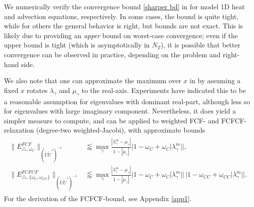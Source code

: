 \documentclass[VANCOUVER,STIX1COL]{WileyNJD-v2}
\begin{document}
We numerically verify the convergence bound \eqref{sharper bd} in 
for model 1D heat and advection equations, respectively. In some cases, the bound is quite tight,
while for others the general behavior is right, but bounds are not exact. This is likely due to
 providing an \emph{upper} bound on worst-case convergence; even if the upper
bound is tight (which  is asymptotically in $N_T$), it is possible that better
convergence can be observed in practice, depending on the problem and right-hand side.


\begin{remark}
We also note that one can approximate the maximum over $x$ in  by assuming
a fixed $x$ rotates $\lambda_\gamma$ and $\mu_\gamma$ to the real-axis. Experiments have indicated this to be a reasonable assumption for eigenvalues with dominant real-part, although less so for eigenvalues with large imaginary component. Nevertheless, it does yield a simpler measure to compute, and can be applied to weighted FCF- and FCFCF-relaxation (degree-two weighted-Jacobi), with approximate bounds
\begin{align} \label{bd FCFCF-relaxation}
\begin{split}
\|E_{\triangle, \hspace{1pt} \omega_C}^{FCF}\|_{(\widetilde{U}\widetilde{U}^*)^{-1}} & \lessapprox
\max_\gamma \frac{|\lambda_\gamma^m - \mu_\gamma|}{1 - |\mu_\gamma|}
|1-\omega_C + \omega_C|\lambda_\gamma^m||\textbf{}, \\
\|{E}_{\triangle, \hspace{1pt} \{\omega_C,\omega_{CC}\}}^{FCFCF}\|_{(\widetilde{U}\widetilde{U}^*)^{-1}} &\lessapprox
\max_\gamma \frac{|\lambda_\gamma^m - \mu_\gamma|}{1 - |\mu_\gamma|}
|1-\omega_C + \omega_C|\lambda_\gamma^m||\, |1-\omega_{CC} + \omega_{CC}|\lambda_\gamma^m||.
\end{split}
\end{align}
For the derivation of the FCFCF-bound, see Appendix \ref{app1}.
\end{remark}
\end{document}
